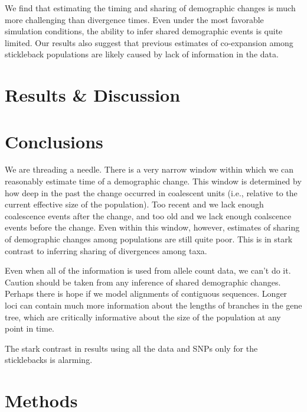 We find that estimating the timing and sharing of demographic changes is much
more challenging than divergence times.
Even under the most favorable simulation conditions, the ability to infer
shared demographic events is quite limited.
Our results also suggest that previous estimates of co-expansion among
stickleback populations are likely caused by lack of information in the data.

\ifembed{

}{}


\section{Results \& Discussion}



\section{Conclusions}

We are threading a needle.
There is a very narrow window within which we can reasonably estimate
time of a demographic change.
This window is determined by how deep in the past the change occurred
in coalescent units (i.e., relative to the current effective size
of the population).
Too recent and we lack enough coalescence events after the change, and too old
and we lack enough coalscence events before the change.
Even within this window, however, estimates of sharing of demographic
changes among populations are still quite poor.
This is in stark contrast to inferring sharing of divergences
among taxa.

Even when all of the information is used from allele count
data, we can't do it.
Caution should be taken from any inference of shared demographic changes.
Perhaps there is hope if we model alignments of contiguous sequences.
Longer loci can contain much more information about the lengths
of branches in the gene tree, which are critically informative
about the size of the population at any point in time.

The stark contrast in results using all the data and SNPs only
for the sticklebacks is alarming.


\section{Methods}


